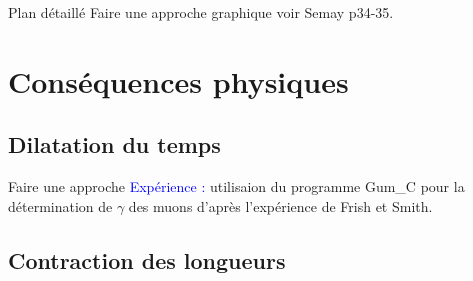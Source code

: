 \begin{reportBlock}{Plan détaillé}
Faire une approche graphique voir Semay p34-35. 

\section{Conséquences physiques}

\subsection{Dilatation du temps}
Faire une approche 
\textcolor{blue}{Expérience :} utilisaion du programme Gum\_C pour la détermination de $\gamma$ des muons d'après l'expérience de Frish et Smith.
\subsection{Contraction des longueurs}

\end{reportBlock}